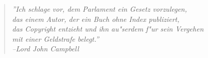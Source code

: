 \documentclass[12pt,a4paper,twoside]{report}
\begin{document}

\cleardoublepage

\begin{thebibliography}{99}



\end{thebibliography}

\cleardoublepage

\begin{quote}{\it
''Ich schlage vor, dem Parlament ein Gesetz vorzulegen, \\
das einem Autor, der ein Buch ohne Index publiziert, \\
das Copyright entzieht und ihn au"serdem f"ur sein Vergehen \\
mit einer Geldstrafe belegt.''\\
\hspace{2cm} --Lord John Campbell}\end{quote}

\printindex
\end{document}
